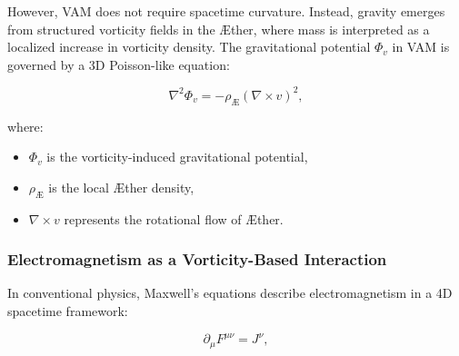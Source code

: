     However, VAM does not require spacetime curvature. Instead, gravity emerges from structured vorticity fields in the Æther, where mass is interpreted as a localized increase in vorticity density. The gravitational potential \( \Phi_v \) in VAM is governed by a 3D Poisson-like equation:

    \begin{equation*}
        \nabla^2 \Phi_v = -\rho_\text{Æ} (\nabla \times v)^2,
    \end{equation*}

    where:
    \begin{itemize}
        \item \( \Phi_v \) is the vorticity-induced gravitational potential,
        \item \( \rho_\text{Æ} \) is the local Æther density,
        \item \( \nabla \times v \) represents the rotational flow of Æther.
    \end{itemize}


\begin{table}[h]
    \centering
    \caption{Comparison between General Relativity and VAM}
    \label{tab:GR_vs_VAM}
\end{table}


    \subsubsection*{Electromagnetism as a Vorticity-Based Interaction}

    In conventional physics, Maxwell's equations describe electromagnetism in a 4D spacetime framework:

    \begin{equation*}
        \partial_\mu F^{\mu\nu} = J^\nu,
    \end{equation*}


